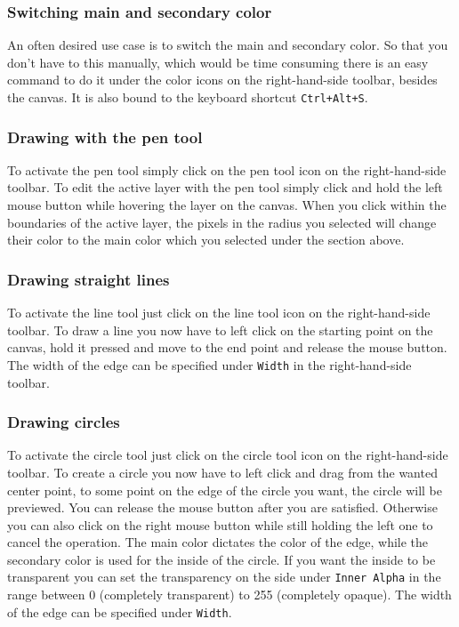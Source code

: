 \documentclass[a4paper, 12pt]{article}
\begin{document}
\subsubsection{Switching main and secondary color}
An often desired use case is to switch the main and secondary color. So that you don't have to this manually, which would be time consuming there is an easy command to do it under the color icons on the right-hand-side toolbar, besides the canvas.
It is also bound to the keyboard shortcut \texttt{Ctrl+Alt+S}.

\subsubsection{Drawing with the pen tool}
To activate the pen tool simply click on the pen tool icon on the right-hand-side  toolbar.
To edit the active layer with the pen tool simply click and hold the left mouse button while hovering the layer on the canvas. When you click within the boundaries of the active layer, the pixels in the radius you selected will change their color to the main color which you selected under the section above.

\subsubsection{Drawing straight lines}
To activate the line tool just click on the line tool icon on the right-hand-side toolbar.
To draw a line you now have to left click on the starting point on the canvas, hold it pressed and move to the end point and release the mouse button. The width of the edge can be specified under \texttt{Width} in the right-hand-side toolbar.

\subsubsection{Drawing circles}
To activate the circle tool just click on the circle tool icon on the right-hand-side toolbar.
To create a circle you now have to left click and drag from the wanted center point, to some point on the edge of the circle you want, the circle will be previewed. You can release the mouse button after you are satisfied. Otherwise you can also click on the right mouse button while still holding the left one to cancel the operation.
The main color dictates the color of the edge, while the secondary color is used for the inside of the circle. If you want the inside to be transparent you can set the transparency on the side under \texttt{Inner Alpha} in the range between 0 (completely transparent) to 255 (completely opaque). The width of the edge can be specified under \texttt{Width}.
\end{document}

